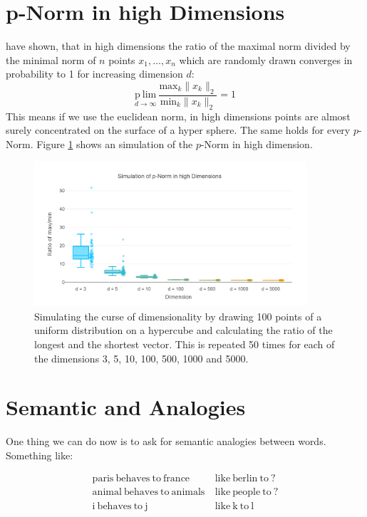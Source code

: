 \section{p-Norm in high Dimensions}

\cite{aggarwal2001surprising} have shown, that in high dimensions the ratio of the 
maximal norm divided by the minimal norm of $n$ points $x_1, \dots, x_n$
which are randomly drawn converges in probability to 1 for increasing
dimension $d$:
\[
\underset{{d\rightarrow\infty}}{\mathrm{p~lim}}\ \frac{\mathrm{max}_k \|x_k\|_2}{\mathrm{min}_k \|x_k\|_2} = 1
\]
This means if we use the euclidean norm, in high dimensions points are almost surely concentrated on the surface of a hyper sphere. The same holds for every $p$-Norm.
Figure \ref{fig:p-norm} shows an simulation of the $p$-Norm in high dimension.


\begin{figure}[!h]
\centering
\includegraphics[width=0.9\textwidth]{images/p_norm_hd.png} 
\caption[Curse of dimensionality simulation.]{Simulating the curse of dimensionality
         by drawing 100 points of a uniform distribution on a hypercube and 
         calculating the ratio of the longest and the shortest vector. This is 
         repeated 50 times for each of the dimensions 3, 5, 10, 100, 500, 
         1000 and 5000.}
\label{fig:p-norm}
\end{figure}


\section{Semantic and Analogies}\label{sec:sem-ana}

One thing we can do now is to ask for semantic analogies between words. 
Something like:

\begin{align*}
\mathrm{paris\ behaves\ to\ france\ }&\mathrm{like\ berlin\ to\ ?} \\
\mathrm{animal\ behaves\ to\ animals\ }&\mathrm{like\ people\ to\ ?} \\
\mathrm{i\ behaves\ to\ j\ }&\mathrm{like\ k\ to\ l} 
\end{align*}

